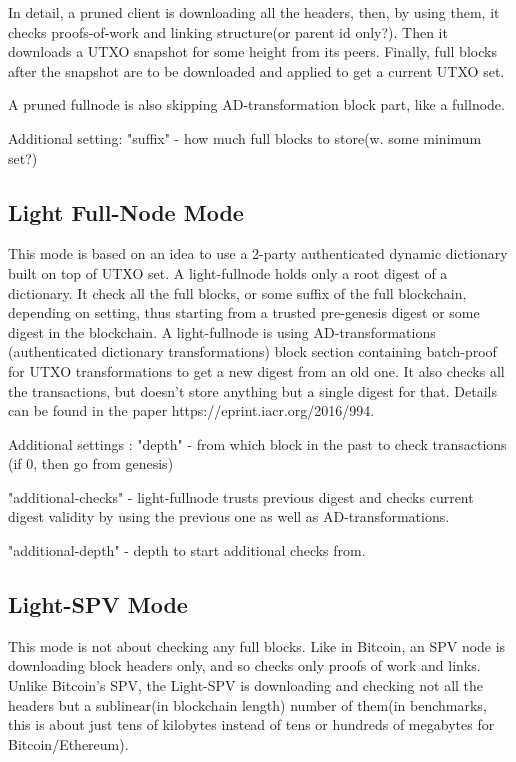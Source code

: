 \documentclass[]{report}   %
\begin{document}
In detail, a pruned client is downloading all the headers, then, by using them,
  it checks proofs-of-work and linking structure(or parent id only?). Then it downloads a UTXO 
  snapshot for some height from its peers. Finally, full blocks after the snapshot are to be downloaded
   and applied to get a current UTXO set.
 
A pruned fullnode is also skipping AD-transformation block part, like a fullnode.      
   
Additional setting: "suffix" - how much full blocks to store(w. some minimum set?)
   
   
\subsection{Light Full-Node Mode}   
\label{sec:light-fullnode}



This mode is based on an idea to use a 2-party authenticated dynamic dictionary built on top of
UTXO set. A light-fullnode holds only a root digest of a dictionary. It check all the full blocks, or some
suffix of the full blockchain, depending on setting, thus starting from a trusted pre-genesis digest or some digest in 
the blockchain. A light-fullnode is using AD-transformations (authenticated dictionary transformations) block section
containing batch-proof for UTXO transformations to get a new digest from an old one. It also checks all the transactions, 
but doesn't store anything but a single digest for that. Details can be found in the paper 
https://eprint.iacr.org/2016/994.

Additional settings : "depth" - from which block in the past to check transactions (if 0, then go from genesis)

"additional-checks" - %
light-fullnode trusts previous digest and checks current digest validity by using the previous one as well
 as AD-transformations.
 
"additional-depth" - depth to start additional checks from.  

\subsection{Light-SPV Mode}
\label{sec:light-spv}


This mode is not about checking any full blocks. Like in Bitcoin, an SPV node is downloading block headers only,
and so checks only proofs of work and links. Unlike Bitcoin's SPV, the Light-SPV is downloading
 and checking not all the headers but a sublinear(in blockchain length) number of them(in benchmarks, this is about just
 tens of kilobytes instead of tens or hundreds of megabytes for Bitcoin/Ethereum).
 
\end{document}
